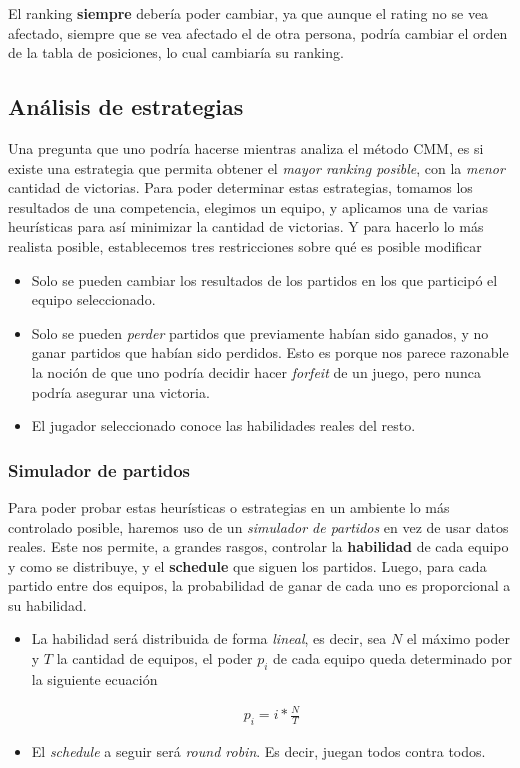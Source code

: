\documentclass[a4paper]{article}
\begin{document}
El ranking \textbf{siempre} debería poder cambiar, ya que aunque el rating no se vea afectado, siempre que se vea afectado el de otra persona, podría cambiar el orden de la tabla de posiciones, lo cual cambiaría su ranking.

\subsection{Análisis de estrategias}

Una pregunta que uno podría hacerse mientras analiza el método CMM, es si existe una estrategia que permita obtener el \textit{mayor ranking posible}, con la \textit{menor} cantidad de victorias.
Para poder determinar estas estrategias, tomamos los resultados de una competencia, elegimos un equipo, y aplicamos una de varias heurísticas para así minimizar la cantidad de victorias. Y para hacerlo lo más realista posible, establecemos tres restricciones sobre qué es posible modificar

\begin{itemize}
    \item Solo se pueden cambiar los resultados de los partidos en los que participó el equipo seleccionado.
    \item Solo se pueden \textit{perder} partidos que previamente habían sido ganados, y no ganar partidos que habían sido perdidos. Esto es porque nos parece razonable la noción de que uno podría decidir hacer \textit{forfeit} de un juego, pero nunca podría asegurar una victoria.
    \item El jugador seleccionado conoce las habilidades reales del resto.
\end{itemize}

\subsubsection{Simulador de partidos}

Para poder probar estas heurísticas o estrategias en un ambiente lo más controlado posible, haremos uso de un \textit{simulador de partidos} en vez de usar datos reales. Este nos permite, a grandes rasgos, controlar la \textbf{habilidad} de cada equipo y como se distribuye, y el \textbf{schedule} que siguen los partidos. Luego, para cada partido entre dos equipos, la probabilidad de ganar de cada uno es proporcional a su habilidad.

\begin{itemize}
    \item La habilidad será distribuida de forma \textit{lineal}, es decir, sea $N$ el máximo poder y $T$ la cantidad de equipos, el poder $p_i$ de cada equipo queda determinado por la siguiente ecuación

    \begin{align*}
        p_i = i * \frac{N}{T}
    \end{align*}
    
    \item El \textit{schedule} a seguir será \textit{round robin}. Es decir, juegan todos contra todos.
\end{itemize}
\end{document}
